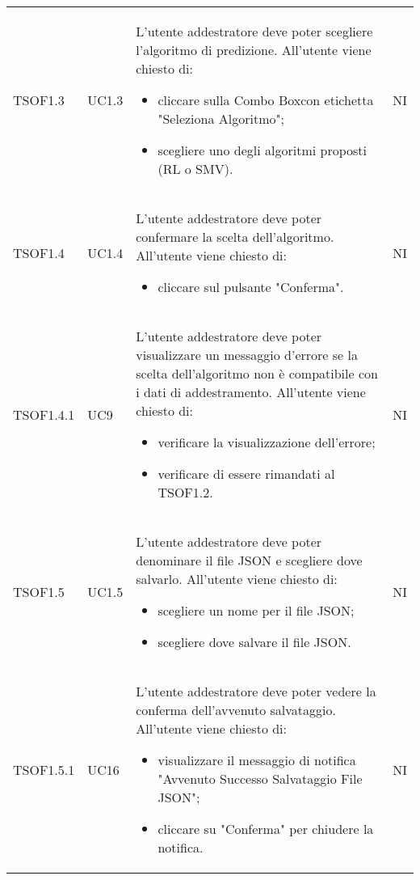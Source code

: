 \begin{longtable}{C{2.5cm} C{2.5cm} L{8cm} C{2cm}}
TSOF1.3 & UC1.3 & 
L'utente addestratore deve poter scegliere l'algoritmo di predizione. \newline All'utente viene chiesto di:
\begin{itemize}
	\item cliccare sulla Combo Box\glo con etichetta "Seleziona Algoritmo";
	\item scegliere uno degli algoritmi proposti (RL o SMV).
\end{itemize} & NI \\
 
TSOF1.4 & UC1.4 & 
L'utente addestratore deve poter confermare la scelta dell'algoritmo. \newline All'utente viene chiesto di:
\begin{itemize}
	\item cliccare sul pulsante "Conferma".
\end{itemize} & NI \\

TSOF1.4.1 & UC9 & 
L'utente addestratore deve poter visualizzare un messaggio d'errore se la scelta dell'algoritmo non è compatibile con i dati di addestramento. \newline All'utente viene chiesto di:
\begin{itemize}
	\item verificare la visualizzazione dell'errore;
	\item verificare di essere rimandati al TSOF1.2.
\end{itemize} & NI \\

TSOF1.5 & UC1.5 & 
L'utente addestratore deve poter denominare il file JSON e scegliere dove salvarlo. \newline All'utente viene chiesto di:
\begin{itemize}
	\item scegliere un nome per il file JSON;
	\item scegliere dove salvare il file JSON.
\end{itemize} & NI \\

TSOF1.5.1 & UC16 &
L'utente addestratore deve poter vedere la conferma dell'avvenuto salvataggio. \newline All'utente viene chiesto di:
\begin{itemize}
	\item visualizzare il messaggio di notifica "Avvenuto Successo Salvataggio File JSON";
	\item cliccare su "Conferma" per chiudere la notifica.
\end{itemize} & NI	\\


\end{longtable}

